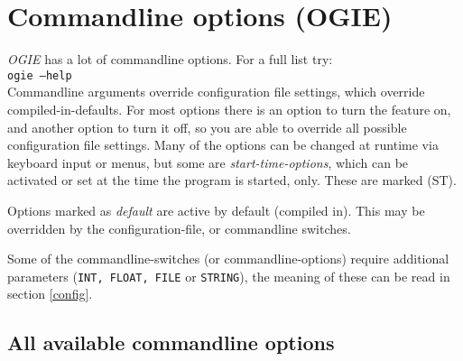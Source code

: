 

\section{Commandline options (OGIE)}
\label{cmdline}

\emph{OGIE} has a lot of commandline options. For a full list try:\\
\texttt{ogie --help} \\
Commandline arguments override configuration file settings, which override
compiled-in-defaults. For most options there is an option to turn the feature on, and another option to turn it off, so you are able to override all
possible configuration file settings. 
Many of the options can be changed at runtime via keyboard input or menus, but some are \emph{start-time-options}, which can be activated or set at the time the program is started, only.
These are marked (ST).

Options marked as \emph{default} are active by default (compiled in). This may be overridden by the configuration-file, or commandline switches.

Some of the commandline-switches (or commandline-options) require  additional parameters (\texttt{INT, FLOAT, FILE} or \texttt{STRING}), the meaning of these can be read in section \ref{config}.

\subsection{All available commandline options}

